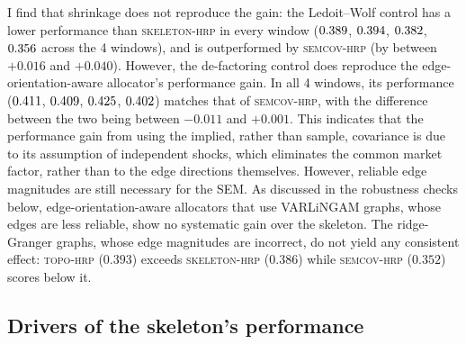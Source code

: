 \documentclass[11pt, a4paper]{report}
\newcommand{\skelhrp}{\textsc{skeleton-hrp}}
\newcommand{\semcovhrp}{\textsc{semcov-hrp}}
\newcommand{\topohrp}{\textsc{topo-hrp}}
\begin{document}
I find that shrinkage does not reproduce the gain: the Ledoit--Wolf
control has a lower performance than \skelhrp{} in every window ($0.389$,
$0.394$, $0.382$, $0.356$ across the 4
windows), and is outperformed by \semcovhrp{} (by between $+0.016$ and $+0.040$).
However, the de-factoring control does reproduce the edge-orientation-aware allocator's performance gain. In all 4 windows, its performance
($0.411$, $0.409$, $0.425$,
$0.402$) matches that of \semcovhrp{}, with the difference between the two being between $-0.011$ and $+0.001$.
This indicates that the performance gain from using the implied, rather than sample,
covariance is due to its assumption of independent shocks,
which eliminates the common market factor, rather than to the edge
directions themselves.
However, reliable edge magnitudes are still necessary for the SEM. As discussed in the robustness checks below, edge-orientation-aware allocators that use VARLiNGAM graphs, whose edges are less reliable, show no systematic gain over the skeleton. The ridge-Granger graphs, whose edge magnitudes are incorrect, do not yield any consistent effect: \topohrp{} ($0.393$) exceeds \skelhrp{} ($0.386$) while \semcovhrp{} ($0.352$) scores below it.

\subsection{Drivers of the skeleton's performance}
\label{sec:skeleton-role}
\end{document}
